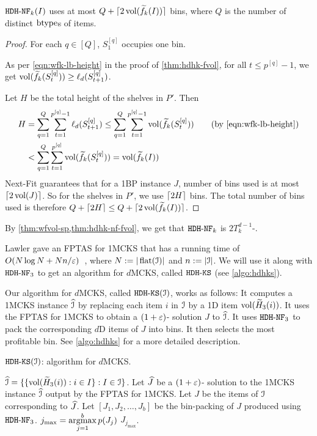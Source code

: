 \begin{theorem}
\label{thm:hdhk-nf-fvol}
$\hdhknf(I)$ uses at most $Q + \smallceil{2\vol(\wfk(I))}$ bins,
where $Q$ is the number of distinct $\btype$s of items.
\end{theorem}
\begin{proof}
For each $q \in [Q]$, $S_1^{[q]}$ occupies one bin.

As per \cref{eqn:wfk-lb-height} in the proof of \cref{thm:hdhk-fvol},
for all $t \le p^{[q]}-1$, we get $\vol(\wfk(S_t^{[q]}))
\ge \ell_d(S_{t+1}^{[q]})$.

Let $H$ be the total height of the shelves in $P'$. Then
\begin{align*}
H &= \sum_{q=1}^Q \sum_{t=1}^{p^{[q]}-1} \ell_d(S_{t+1}^{[q]})
\le \sum_{q=1}^Q \sum_{t=1}^{p^{[q]}-1} \vol(\wfk(S_t^{[q]}))  \tag{by \eqref{eqn:wfk-lb-height}}
\\ &< \sum_{q=1}^Q \sum_{t=1}^{p^{[q]}} \vol(\wfk(S_t^{[q]}))
= \vol(\wfk(I))
\end{align*}
Next-Fit guarantees that for a 1BP instance $J$, number of bins used is at most $\ceil{2\vol(J)}$.
So for the shelves in $P'$, we use $\ceil{2H}$ bins.
The total number of bins used is therefore
$Q + \ceil{2H} \le Q + \smallceil{2\vol(\wfk(I))}$.
\end{proof}

By \cref{thm:wfvol-sp,thm:hdhk-nf-fvol}, we get that $\hdhknf$ is $2T_k^{d-1}$-\asymAppx{}.

Lawler gave an FPTAS for 1MCKS that has a running time of
$O(N\log N + Nn/\eps)$~\cite{lawler1979fast},
where $N \defeq |\flatten(\Ical)|$ and $n \defeq |\Ical|$.
We will use it along with $\hdhknf[3]$ to get an algorithm for $d$MCKS,
called $\hdhks$ (see \cref{algo:hdhks}).

Our algorithm for $d$MCKS, called $\hdhks(\Ical)$, works as follows:
It computes a 1MCKS instance $\Icalhat$ by replacing each item $i$ in $\Ical$
by a 1D item $\vol(\wHk[3](i))$.
It uses the FPTAS for 1MCKS to obtain a $(1+\eps)$-\appx{} solution $J$ to $\Icalhat$.
It uses $\hdhknf[3]$ to pack the corresponding $d$D items of $J$ into bins.
It then selects the most profitable bin.
See \cref{algo:hdhks} for a more detailed description.

\begin{algorithm}[!ht]
\caption{$\hdhks(\Ical)$: algorithm for $d$MCKS.}
\label{algo:hdhks}
\begin{algorithmic}[1]
\State $\Icalhat = \{\{\vol(\wHk[3](i)): i \in I\}: I \in \Ical\}$.
\State Let $\Jhat$ be a $(1+\eps)$-\appx{} solution to the 1MCKS instance $\Icalhat$
    output by the FPTAS for 1MCKS.
\State Let $J$ be the items of $\Ical$ corresponding to $\Jhat$.
\State Let $[J_1, J_2, \ldots, J_b]$ be the bin-packing of $J$ produced using $\hdhknf[3]$.
\State ${\displaystyle j_{\max} = \argmax_{j=1}^b p(J_j)}$
\State \Return $J_{j_{\max}}$.
\end{algorithmic}
\end{algorithm}


